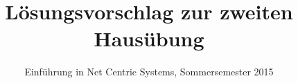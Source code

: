 \documentclass[a4paper,
			llpt,
			solution,
			accentcolor=tud2d,
			colorbacktitle
			]
			{tudexercise}
\title{Lösungsvorschlag zur zweiten Hausübung}
\subtitle{Einführung in Net Centric Systems, Sommersemester 2015}
\begin{document}
\maketitle

\section{}
\section{}
\section{}
\section{}
\end{document}
